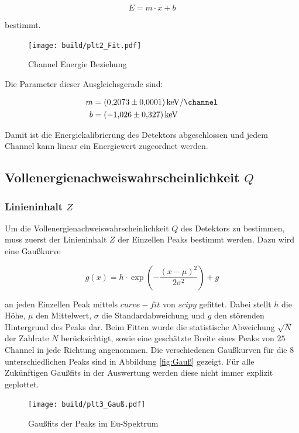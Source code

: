 \begin{equation}
	E=m \cdot x +b
\end{equation}

bestimmt.

\begin{figure}[H]
	\centering
	\texttt{[image: build/plt2\_Fit.pdf]}
	\caption{Channel Energie Beziehung}\label{fig:Eu_Fit}
\end{figure}

Die Parameter dieser Ausgleichsgerade sind:

\begin{align*}
	m & =\qty[per-mode=fraction]{0.2073(0.0001)}{\kilo\eV\per\channel} \\
	b & =\qty{-1.026(0.327)}{\kilo\eV}
\end{align*}

Damit ist die Energiekalibrierung des Detektors abgeschlossen und jedem Channel
kann linear ein Energiewert zugeordnet werden.

\subsection{Vollenergienachweiswahrscheinlichkeit $Q$}
\subsubsection{Linieninhalt $Z$}
Um die Vollenergienachweiswahrscheinlichkeit $Q$ des Detektors zu bestimmen,
muss zuerst der Linieninhalt $Z$ der Einzellen Peaks bestimmt werden. Dazu wird
eine Gaußkurve

\begin{equation}
	g(x)=h\cdot \exp(-\frac{(x-\mu )^2}{2\sigma^2})+g
	\label{eq:Gauß}
\end{equation}

an jeden Einzellen Peak mittels $curve-fit$ von $scipy$ \cite{scipy} gefittet.
Dabei stellt $h$ die Höhe, $\mu$ den Mittelwert, $\sigma$ die
Standardabweichung und $g$ den störenden Hintergrund des Peaks dar. Beim Fitten
wurde die statistische Abweichung $\sqrt{N}$ der Zahlrate $N$ berücksichtigt,
sowie eine geschätzte Breite eines Peaks von $25$ Channel in jede Richtung
angenommen. Die verschiedenen Gaußkurven für die 8 unterschiedlichen Peaks sind
in Abbildung \eqref{fig:Gauß} gezeigt. Für alle Zukünftigen Gaußfits in der
Auswertung werden diese nicht immer explizit geplottet.

\begin{figure}
	\centering
	\texttt{[image: build/plt3\_Gauß.pdf]}
	\caption{Gaußfits der Peaks im Eu-Spektrum}
	\label{fig:Gauß}
\end{figure}

